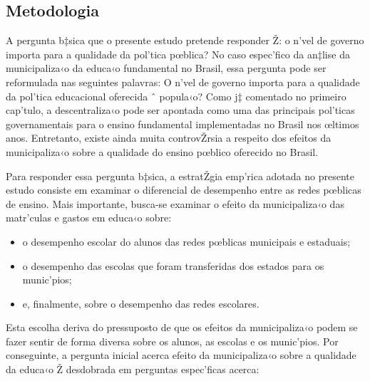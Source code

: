 \documentclass[a4paper, 12pt]{article}
\begin{document}


\subsection{Metodologia}

A pergunta b‡sica que o presente estudo pretende responder Ž: o n’vel de governo importa para a qualidade da pol’tica pœblica? No caso espec’fico da an‡lise da municipaliza‹o da educa‹o fundamental no Brasil, essa pergunta pode ser reformulada nas seguintes palavras: O n’vel de governo importa para a qualidade da pol’tica educacional oferecida ˆ popula‹o? Como j‡ comentado no primeiro cap’tulo, a descentraliza‹o pode ser apontada como uma das principais pol’ticas governamentais para o ensino fundamental implementadas no Brasil nos œltimos anos. Entretanto, existe ainda muita controvŽrsia a respeito dos efeitos da municipaliza‹o sobre a qualidade do ensino pœblico oferecido no Brasil.  

Para responder essa pergunta b‡sica, a estratŽgia emp’rica adotada no presente estudo consiste em examinar o diferencial de desempenho entre as redes pœblicas de ensino. Mais importante, busca-se examinar o efeito da municipaliza‹o das matr’culas e gastos em educa‹o sobre: 

\begin{itemize}

\item o desempenho escolar do alunos das redes pœblicas municipais e estaduais;

\item o desempenho das escolas que foram transferidas dos estados para os munic’pios;

\item e, finalmente, sobre o desempenho das redes escolares.

\end{itemize}

Esta escolha deriva do pressuposto de que os efeitos da municipaliza‹o podem se fazer sentir de forma diversa sobre os alunos, as escolas e os munic’pios. Por conseguinte, a pergunta inicial acerca efeito da municipaliza‹o sobre a qualidade da educa‹o Ž desdobrada em perguntas espec’ficas acerca:
\end{document}
